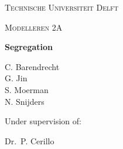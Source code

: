 \documentclass{report}
\begin{document}
\begin{titlepage}


	\centering
	{\scshape\Large Technische Universiteit Delft\par}
	\vspace{1cm}
	{\scshape\Large Modelleren 2A\par}
	\vspace{1.5cm}
	{\Huge\bfseries Segregation\par}
	\vspace{2cm}
	{\Large
	C. Barendrecht\\ 
	G. Jin\\
	S. Moerman\\
	N. Snijders\par}
	\vfill
	Under supervision of:\par
	Dr.~P. Cerillo

	\vfill
\end{titlepage}
\ClearWallPaper
\end{document}
